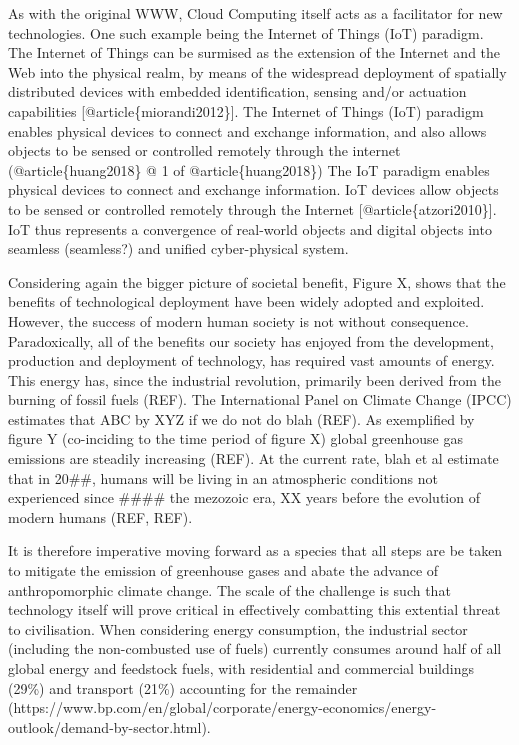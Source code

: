 \documentclass[reprint, floatfix, groupaddress, prb]{revtex4-1}
\begin{document}
As with the original WWW, Cloud Computing itself acts as a facilitator
for new technologies. One such example being the Internet of Things
(IoT) paradigm. The Internet of Things can be surmised as the extension
of the Internet and the Web into the physical realm, by means of the
widespread deployment of spatially distributed devices with embedded
identification, sensing and/or actuation capabilities
{[}@article\{miorandi2012\}{]}. The Internet of Things (IoT) paradigm
enables physical devices to connect and exchange information, and also
allows objects to be sensed or controlled remotely through the internet
(@article\{huang2018\} @ 1 of @article\{huang2018\}) The IoT paradigm
enables physical devices to connect and exchange information. IoT
devices allow objects to be sensed or controlled remotely through the
Internet {[}@article\{atzori2010\}{]}. IoT thus represents a convergence
of real-world objects and digital objects into seamless (seamless?) and
unified cyber-physical system.

Considering again the bigger picture of societal benefit, Figure X,
shows that the benefits of technological deployment have been widely
adopted and exploited. However, the success of modern human society is
not without consequence. Paradoxically, all of the benefits our society
has enjoyed from the development, production and deployment of
technology, has required vast amounts of energy. This energy has, since
the industrial revolution, primarily been derived from the burning of
fossil fuels (REF). The International Panel on Climate Change (IPCC)
estimates that ABC by XYZ if we do not do blah (REF). As exemplified by
figure Y (co-inciding to the time period of figure X) global greenhouse
gas emissions are steadily increasing (REF). At the current rate, blah
et al estimate that in 20\#\#, humans will be living in an atmospheric
conditions not experienced since \#\#\#\# the mezozoic era, XX years
before the evolution of modern humans (REF, REF).

It is therefore imperative moving forward as a species that all steps
are be taken to mitigate the emission of greenhouse gases and abate the
advance of anthropomorphic climate change. The scale of the challenge is
such that technology itself will prove critical in effectively
combatting this extential threat to civilisation. When considering
energy consumption, the industrial sector (including the non-combusted
use of fuels) currently consumes around half of all global energy and
feedstock fuels, with residential and commercial buildings (29\%) and
transport (21\%) accounting for the remainder
(https://www.bp.com/en/global/corporate/energy-economics/energy-outlook/demand-by-sector.html).
\end{document}
